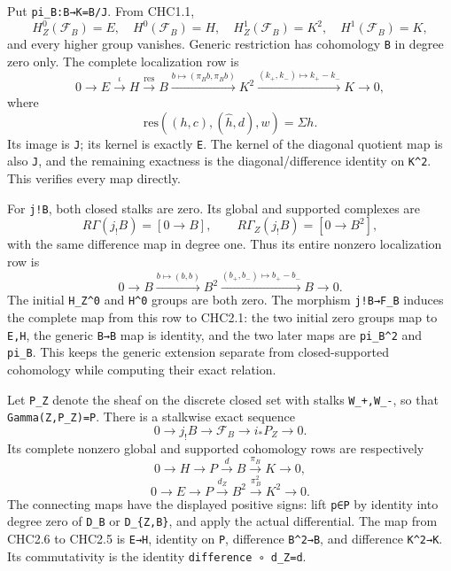Put \texttt{pi\_B:B→K=B/J}. From CHC1.1, \[
H_Z^0(\mathcal F_B)=E,\quad
H^0(\mathcal F_B)=H,\quad
H_Z^1(\mathcal F_B)=K^2,\quad
H^1(\mathcal F_B)=K,
\] and every higher group vanishes. Generic restriction has cohomology
\texttt{B} in degree zero only. The complete localization row is \[
0\longrightarrow E\xrightarrow{\iota}H
\xrightarrow{\mathrm{res}}B
\xrightarrow{b\mapsto(\pi_Bb,\pi_Bb)}K^2
\xrightarrow{(k_+,k_-)\mapsto k_+-k_-}K
\longrightarrow0,
\tag{CHC2.1}
\] where \[
\mathrm{res}((h,c),(\widehat h,d),w)=\Sigma h.
\] Its image is \texttt{J}; its kernel is exactly \texttt{E}. The kernel
of the diagonal quotient map is also \texttt{J}, and the remaining
exactness is the diagonal/difference identity on \texttt{K\^{}2}. This
verifies every map directly.

For \texttt{j!B}, both closed stalks are zero. Its global and supported
complexes are \[
R\Gamma(j_!B)=[0\to B],\qquad
R\Gamma_Z(j_!B)=[0\to B^2],
\tag{CHC2.2}
\] with the same difference map in degree one. Thus its entire nonzero
localization row is \[
0\longrightarrow B\xrightarrow{b\mapsto(b,b)}B^2
\xrightarrow{(b_+,b_-)\mapsto b_+-b_-}B
\longrightarrow0.
\tag{CHC2.3}
\] The initial \texttt{H\_Z\^{}0} and \texttt{H\^{}0} groups are both
zero. The morphism \texttt{j!B→F\_B} induces the complete map from this
row to CHC2.1: the two initial zero groups map to \texttt{E,H}, the
generic \texttt{B→B} map is identity, and the two later maps are
\texttt{pi\_B\^{}2} and \texttt{pi\_B}. This keeps the generic extension
separate from closed-supported cohomology while computing their exact
relation.

Let \texttt{P\_Z} denote the sheaf on the discrete closed set with
stalks \texttt{W\_+,W\_-}, so that \texttt{Gamma(Z,P\_Z)=P}. There is a
stalkwise exact sequence \[
0\to j_!B\to\mathcal F_B\to i_*P_Z\to0.
\tag{CHC2.4}
\] Its complete nonzero global and supported cohomology rows are
respectively \[
0\to H\to P\xrightarrow d B\xrightarrow{\pi_B}K\to0,
\tag{CHC2.5}
\] \[
0\to E\to P\xrightarrow{d_Z}B^2
\xrightarrow{\pi_B^2}K^2\to0.
\tag{CHC2.6}
\] The connecting maps have the displayed positive signs: lift
\texttt{p∈P} by identity into degree zero of \texttt{D\_B} or
\texttt{D\_\{Z,B\}}, and apply the actual differential. The map from
CHC2.6 to CHC2.5 is \texttt{E→H}, identity on \texttt{P}, difference
\texttt{B\^{}2→B}, and difference \texttt{K\^{}2→K}. Its commutativity
is the identity \texttt{difference\ ∘\ d\_Z=d}.

